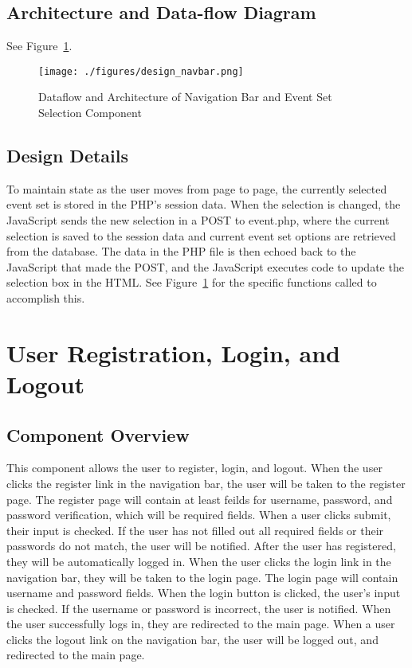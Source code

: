 \subsection{ Architecture and Data-flow Diagram}
See Figure~\ref{design_navbar}.
\begin{figure}[tbh]
\begin{center}
\texttt{[image: ./figures/design\_navbar.png]}
\end{center}
\caption{Dataflow and Architecture of Navigation Bar and Event Set Selection Component \label{design_navbar}}
\end{figure} 

\subsection{Design Details}
To maintain state as the user moves from page to page, the currently selected event set is stored in the PHP's session data. When the selection is changed, the JavaScript sends the new selection in a POST to event.php, where the current selection is saved to the session data and current event set options are retrieved from the database.  The data in the PHP file is then echoed back to the JavaScript that made the POST, and the JavaScript executes code to update the selection box in the HTML. See Figure~\ref{design_navbar} for the specific functions called to accomplish this. 

\section{User Registration, Login, and Logout}

\subsection{Component  Overview}
This component allows the user to register, login, and logout. When the user clicks the register link in the navigation bar, the user will be taken to the register page. The register page will contain at least feilds for username, password, and password verification, which will be required fields. When a user clicks submit, their input is checked. If the user has not filled out all required fields or their passwords do not match, the user will be notified. After the user has registered, they will be automatically logged in. When the user clicks the login link in the navigation bar, they will be taken to the login page. The login page will contain username and password fields. When the login button is clicked, the user's input is checked. If the username or password is incorrect, the user is notified. When the user successfully logs in, they are redirected to the main page. When a user clicks the logout link on the navigation bar, the user will be logged out, and redirected to the main page.

